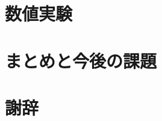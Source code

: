 \documentclass[uplatex]{suribt}
\begin{document}
\chapter{数値実験}

\chapter{まとめと今後の課題}
\backmatter%
\chapter{謝辞}%



\appendix%
\chapter{}
\end{document}
